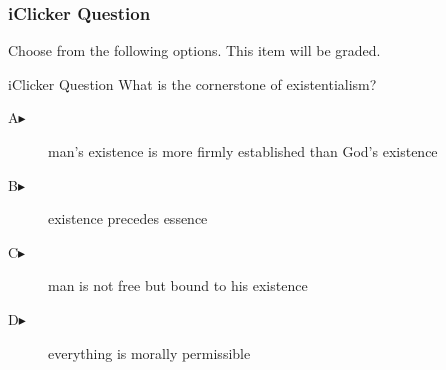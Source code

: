 \begin{frame}
  \frametitle{iClicker Question}
Choose from the following options. This item will be graded.
\begin{block}{iClicker Question}
What is the cornerstone of existentialism?
\end{block}
\begin{description}
\item[A\hspace{.2in}$\blacktriangleright$] man's existence is more firmly established than God's existence
\item[B\hspace{.2in}$\blacktriangleright$] existence precedes essence
\item[C\hspace{.2in}$\blacktriangleright$] man is not free but bound to his existence
\item[D\hspace{.2in}$\blacktriangleright$] everything is morally permissible
\end{description}
\end{frame}
